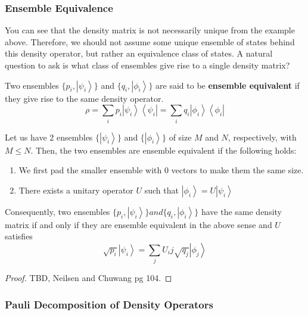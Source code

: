 \documentclass{article}
\newcommand{\ket}[1]{\ensuremath{\left|#1\right\rangle}}
\newcommand{\bra}[1]{\ensuremath{\left\langle#1\right|}}
\begin{document}
    \subsubsection{Ensemble Equivalence}

      You can see that the density matrix is not necessarily unique from the example above. Therefore, we should not assume some unique ensemble of states behind this density operator, but rather an equivalence class of states. A natural question to ask is what class of ensembles give rise to a single density matrix? 

      \begin{definition}
        Two ensembles $\{p_i, \ket{\psi_i}\}$ and $\{q_i, \ket{\phi_i}\}$ are said to be \textbf{ensemble equivalent} if they give rise to the same density operator. 
        \begin{equation}
          \rho = \sum_i p_i \ket{\psi_i} \bra{\psi_i} = \sum_i q_i \ket{\phi_i} \bra{\phi_i}
        \end{equation}
      \end{definition}

      \begin{theorem}
        Let us have 2 ensembles $\{\ket{\psi_i}\}$ and $\{\ket{\phi_i}\}$ of size $M$ and $N$, respectively, with $M \leq N$. Then, the two ensembles are ensemble equivalent if the following holds: 
        \begin{enumerate}
          \item We first pad the smaller ensemble with $0$ vectors to make them the same size. 
          \item There exists a unitary operator $U$ such that $\ket{\phi_i} = U \ket{\psi_i}$
        \end{enumerate}
        Consequently, two ensembles $\{p_i, \ket{\psi_i}\} and \{q_i, \ket{\phi_i}\}$ have the same density matrix if and only if they are ensemble equivalent in the above sense and $U$ satisfies 
        \begin{equation}
          \sqrt{p_i} \ket{\psi_i} = \sum_j U_ij \sqrt{q_j} \ket{\phi_j}
        \end{equation}
      \end{theorem}
      \begin{proof}
        TBD, Neilsen and Chuwang pg 104. 
      \end{proof}

    \subsubsection{Pauli Decomposition of Density Operators}
\end{document}
